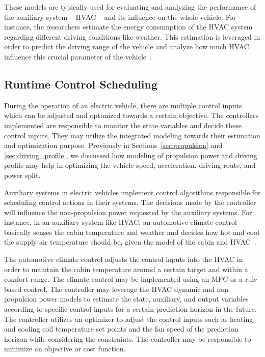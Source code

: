 These models are typically used for evaluating and analyzing the performance of the auxiliary system – HVAC – and its influence on the whole vehicle. For instance, the researchers estimate the energy consumption of the HVAC system regarding different driving conditions like weather. This estimation is leveraged in order to predict the driving range of the vehicle and analyze how much HVAC influence this crucial parameter of the vehicle~\cite{AF_23,AF_28,AF_29}. 

\subsection{Runtime Control Scheduling}

During the operation of an electric vehicle, there are multiple control inputs which can be adjusted and optimized towards a certain objective. The controllers implemented are responsible to monitor the state variables and decide these control inputs. They may utilize the integrated modeling towards their estimation and optimization purpose. Previously in Sections~\ref{sec:propulsion} and \ref{sec:driving_profile}, we discussed how modeling of propulsion power and driving profile may help in optimizing the vehicle speed, acceleration, driving route, and power split.

Auxiliary systems in electric vehicles implement control algorithms responsible for scheduling control actions in their systems. The decisions made by the controller will influence the non-propulsion power requested by the auxiliary systems. For instance, in an auxiliary system like HVAC, an automotive climate control basically senses the cabin temperature and weather and decides how hot and cool the supply air temperature should be, given the model of the cabin and HVAC~\cite{AF_30,AF_31,AF_32,AF_33}.

The automotive climate control adjusts the control inputs into the HVAC in order to maintain the cabin temperature around a certain target and within a comfort range. The climate control may be implemented using an MPC or a rule-based control. The controller may leverage the HVAC dynamic and non-propulsion power models to estimate the state, auxiliary, and output variables according to specific control inputs for a certain prediction horizon in the future. The controller utilizes an optimizer to adjust the control inputs such as heating and cooling coil temperature set points and the fan speed of the prediction horizon while considering the constraints. The controller may be responsible to minimize an objective or cost function.

